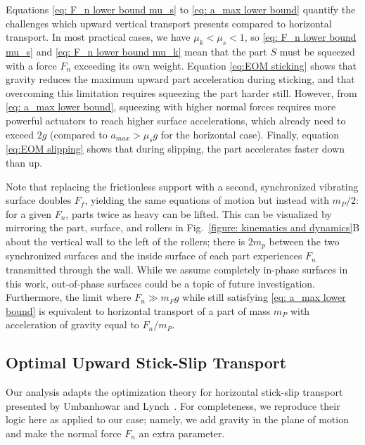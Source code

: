 Equations \eqref{eq: F_n lower bound mu_s} to \eqref{eq: a_max lower bound} quantify the challenges which upward vertical transport presents compared to horizontal transport.
%
In most practical cases, we have $\mu_k < \mu_s < 1$, so \eqref{eq: F_n lower bound mu_s} and \eqref{eq: F_n lower bound mu_k} mean that the part $S$ must be squeezed with a force $F_n$ exceeding its own weight.
%
Equation \eqref{eq:EOM sticking} shows that gravity reduces the maximum upward part acceleration during sticking, and that overcoming this limitation requires squeezing the part harder still.
%
However, from \eqref{eq: a_max lower bound}, squeezing with higher normal forces requires more powerful actuators to reach higher surface accelerations, which already need to exceed $2g$ (compared to $a_{max} > \mu_s g$ for the horizontal case).
%
Finally, equation \eqref{eq:EOM slipping} shows that during slipping, the part accelerates faster down than up.

Note that replacing the frictionless support with a second, synchronized vibrating surface doubles $F_f$, yielding the same equations of motion but instead with $m_P / 2$: for a given $F_n$, parts twice as heavy can be lifted. 
%
%
This can be visualized by mirroring the part, surface, and rollers in Fig.~\ref{figure: kinematics and dynamics}B about the vertical wall to the left of the rollers; there is $2m_p$ between the two synchronized surfaces and the inside surface of each part experiences $F_n$ transmitted through the wall.
%
While we assume completely in-phase surfaces in this work, out-of-phase surfaces could be a topic of future investigation.
%
Furthermore, the limit where $F_n \gg m_P g$ while still satisfying \eqref{eq: a_max lower bound} is equivalent to horizontal transport of a part of mass $m_P$ with acceleration of gravity equal to $F_n/m_P$. 

\subsection{Optimal Upward Stick-Slip Transport}\label{section: optimal upward}

Our analysis adapts the optimization theory for horizontal stick-slip transport presented by Umbanhowar and Lynch~\cite{umbanhowar2008optimal}. For completeness, we reproduce their logic here as applied to our case; namely, we add gravity in the plane of motion and make the normal force $F_n$ an extra parameter.

